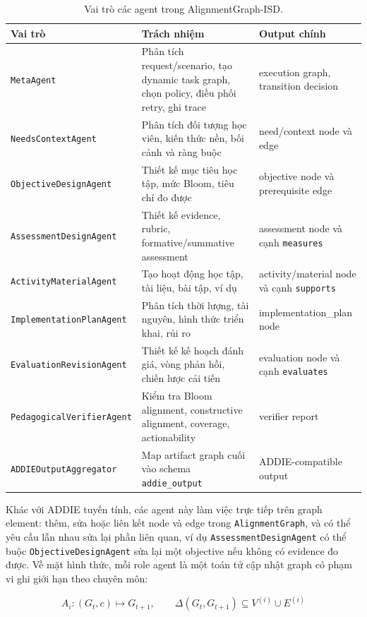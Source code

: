 \documentclass[../main.tex]{subfiles}
\begin{document}
\begin{table}[H]
\centering
\footnotesize
\caption{Vai trò các agent trong AlignmentGraph-ISD.}
\label{tab:agent-roles}
\begin{tabular}{p{3.3cm}p{6.2cm}p{3.8cm}}
\hline
\textbf{Vai trò} & \textbf{Trách nhiệm} & \textbf{Output chính} \\
\hline
\texttt{Meta\-Agent} & Phân tích request/scenario, tạo dynamic task graph, chọn policy, điều phối retry, ghi trace & execution graph, transition decision \\
\texttt{Needs\-Context\-Agent} & Phân tích đối tượng học viên, kiến thức nền, bối cảnh và ràng buộc & need/context node và edge \\
\texttt{Objective\-Design\-Agent} & Thiết kế mục tiêu học tập, mức Bloom, tiêu chí đo được & objective node và prerequisite edge \\
\texttt{Assessment\-Design\-Agent} & Thiết kế evidence, rubric, formative/summative assessment & assessment node và cạnh \texttt{measures} \\
\texttt{Activity\-Material\-Agent} & Tạo hoạt động học tập, tài liệu, bài tập, ví dụ & activity/material node và cạnh \texttt{supports} \\
\texttt{Implementation\-Plan\-Agent} & Phân tích thời lượng, tài nguyên, hình thức triển khai, rủi ro & implementation\_plan node \\
\texttt{Evaluation\-Revision\-Agent} & Thiết kế kế hoạch đánh giá, vòng phản hồi, chiến lược cải tiến & evaluation node và cạnh \texttt{evaluates} \\
\texttt{Pedagogical\-Verifier\-Agent} & Kiểm tra Bloom alignment, constructive alignment, coverage, actionability & verifier report \\
\texttt{ADDIEOutput\-Aggregator} & Map artifact graph cuối vào schema \texttt{addie\_output} & ADDIE-compatible output \\
\hline
\end{tabular}
\end{table}

Khác với ADDIE tuyến tính, các agent này làm việc trực tiếp trên graph element: thêm, sửa hoặc liên kết node và edge trong \texttt{AlignmentGraph}, và có thể yêu cầu lẫn nhau sửa lại phần liên quan, ví dụ \texttt{AssessmentDesignAgent} có thể buộc \texttt{ObjectiveDesignAgent} sửa lại một objective nếu không có evidence đo được. Về mặt hình thức, mỗi role agent là một toán tử cập nhật graph có phạm vi ghi giới hạn theo chuyên môn:

\begin{equation}\label{eq:agent-scope}
A_i : (G_t, c) \mapsto G_{t+1}, \qquad \Delta(G_t, G_{t+1}) \subseteq V^{(i)} \cup E^{(i)}
\end{equation}
\end{document}
